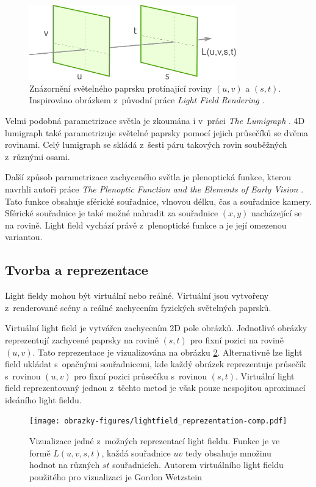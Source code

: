\begin{figure}[h]
	\centering
	\includegraphics[width=0.8\textwidth]{obrazky-figures/lightfield_eq.pdf}
	\caption{Znázornění světelného paprsku protínající roviny \((u,v)\) a \((s,t)\). Inspirováno obrázkem z~původní práce \emph{Light Field Rendering} \cite{levoy1996light}. }
	\label{fig:lightfield_coordinates}
\end{figure}

Velmi podobná parametrizace světla je zkoumána i v~práci \emph{The Lumigraph} \cite{gortler1996lumigraph}. 4D lumigraph také parametrizuje světelné paprsky pomocí jejich průsečíků se dvěma rovinami. Celý lumigraph se skládá z~šesti páru takových rovin souběžných z~různými osami. 

Další způsob parametrizace zachyceného světla je plenoptická funkce, kterou navrhli autoři práce \emph{The Plenoptic Function and
the Elements of Early Vision} \cite{bergen1991plenoptic}. Tato funkce obsahuje sférické souřadnice, vlnovou délku, čas a souřadnice kamery. Sférické souřadnice je také možné nahradit za souřadnice $(x,y)$ nacházející se na rovině. Light field vychází právě z~plenoptické funkce a je její omezenou variantou.


\subsection{Tvorba a reprezentace}
\label{sec:theory_create}
Light fieldy mohou být virtuální nebo reálné. Virtuální jsou vytvořeny z~renderované scény a reálné zachycením fyzických světelných paprsků.

Virtuální light field je vytvářen zachycením 2D pole obrázků. Jednotlivé obrázky reprezentují zachycené paprsky na rovině \((s,t)\) pro fixní pozici na rovině \((u,v)\). Tato reprezentace je vizualizována na obrázku \ref{fig:lightfield_reprezentation}. Alternativně lze light field ukládat s~opačnými souřadnicemi, kde každý obrázek reprezentuje průsečík s~rovinou \((u,v)\) pro fixní pozici průsečíku s~rovinou \((s,t)\). Virtuální light field reprezentovaný jednou z~těchto metod je však pouze nespojitou aproximací ideáního light fieldu.
\begin{figure}[h]
	\centering
	\texttt{[image: obrazky-figures/lightfield\_reprezentation-comp.pdf]}
	\caption{Vizualizace jedné z~možných reprezentací light fieldu. Funkce je ve formě $L(u, v, s, t)$, každá souřadnice $uv$ tedy obsahuje množinu hodnot na různých $st$ souřadnicích. Autorem virtuálního light fieldu použitého pro vizualizaci je Gordon Wetzstein \cite{lightfieldarchive}  }
	\label{fig:lightfield_reprezentation}
\end{figure}

